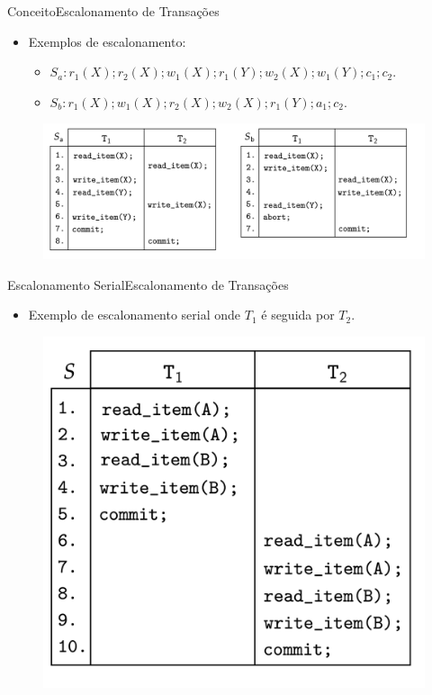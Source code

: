 \documentclass[t]{beamer}
\begin{document}
\begin{ftst}{Conceito}{Escalonamento de Transações}

\begin{itemize}
    \item Exemplos de escalonamento:
    \begin{itemize}
        \item $S_a: r_1(X); r_2(X); w_1(X); r_1(Y); w_2(X); w_1(Y); c_1; c_2$.
        \item $S_b: r_1(X); w_1(X); r_2(X); w_2(X); r_1(Y); a_1; c_2$.
    \end{itemize}
\end{itemize}
\begin{figure}
    \centering
    \includegraphics[scale=0.13]{Figuras_transacoes/11.png}
\end{figure}
\end{ftst}


\begin{ftst}{Escalonamento Serial}{Escalonamento de Transações}

\begin{itemize}
    \item Exemplo de escalonamento serial onde $T_1$ é seguida por $T_2$.
\end{itemize}
\begin{figure}
    \centering
    \includegraphics[scale=0.15]{Figuras_transacoes/12.png}
\end{figure}
\end{ftst}
\end{document}
